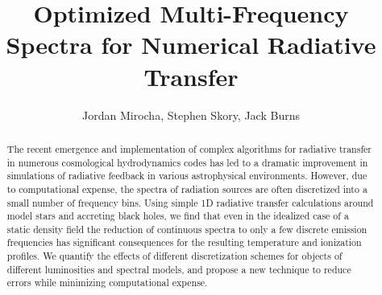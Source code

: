 \documentclass[preprint2]{aastex}              %
\begin{document}
    
\newcommand{\HI}{\text{HI}}
\newcommand{\HII}{\text{HII}}
\newcommand{\HeI}{\text{HeI}}
\newcommand{\HeII}{\text{HeII}}
\newcommand{\HeIII}{\text{HeIII}}
\newcommand{\nHI}{n_{\text{HI}}} 
\newcommand{\nHII}{n_{\text{HII}}}  
\newcommand{\nHeI}{n_{\text{HeI}}}
\newcommand{\nHeII}{n_{\text{HeII}}}
\newcommand{\nHeIII}{n_{\text{HeIII}}}  
\newcommand{\nel}{n_{\text{e}}}  
\newcommand{\nb}{n_{\text{b}}}
\newcommand{\nnu}{$n_{\nu}$ }
\newcommand{\ncol}{n_i^{\text{col}}}
\newcommand{\gHI}{\Gamma_{\text{HI}}}  
\newcommand{\gHeI}{\Gamma_{\text{HeI}}}
\newcommand{\gHeII}{\Gamma_{\text{HeII}}}
\newcommand{\aHII}{\alpha_{\text{HII}}}  
\newcommand{\aHeII}{\alpha_{\text{HeII}}}  
\newcommand{\aHeIII}{\alpha_{\text{HeIII}}} 
\newcommand{\bHeI}{\beta_{\text{HeI}}}  
\newcommand{\bHeII}{\beta_{\text{HeII}}}  
\newcommand{\xHeII}{\xi_{\text{HeII}}}
\newcommand{\kB}{k_{\text{B}}}
\newcommand{\fheat}{f_{\text{heat}}}
\newcommand{\Lbol}{\mathcal{L}_{\text{bol}}}
\newcommand{\spec}{\mathcal{N}}
\newcommand{\Heat}{\mathcal{H}}

\title {Optimized Multi-Frequency Spectra for Numerical Radiative Transfer}
\author{Jordan Mirocha, Stephen Skory, Jack Burns}

\begin{abstract}
The recent emergence and implementation of complex algorithms for radiative transfer in numerous cosmological hydrodynamics codes has led to a dramatic improvement in simulations of radiative feedback in various astrophysical environments.  However, due to computational expense, the spectra of radiation sources are often discretized into a small number of frequency bins.  Using simple 1D radiative transfer calculations around model stars and accreting black holes, we find that even in the idealized case of a static density field the reduction of continuous spectra to only a few discrete emission frequencies has significant consequences for the resulting temperature and ionization profiles.  We quantify the effects of different discretization schemes for objects of different luminosities and spectral models, and propose a new technique to reduce errors while minimizing computational expense.
\end{abstract} 
\end{document}

